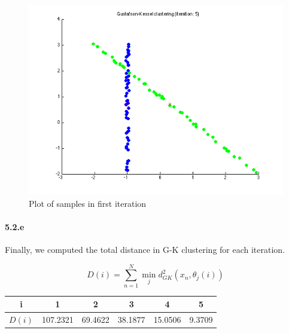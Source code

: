 \documentclass[a4paper]{article}
\begin{document}
	\begin{figure}[H]
		\centering
			\includegraphics[scale=.55]{images/gk_clustering_5.png}
		\caption{Plot of samples in first iteration}
	\end{figure}
	
\paragraph{5.2.e} Finally, we computed the total distance in G-K clustering for each iteration.

	\begin{equation}
		D(i) = \sum_{n=1}^N \min_j d^2_{GK}(x_n, \theta_j(i))
	\end{equation}
	
	\begin{center}
		\begin{tabular}{ |c |c |c |c |c |c| }
			\hline
			i & 1 & 2 & 3 & 4 & 5 \\ \hline
			$D(i)$ & 107.2321 &  69.4622 &  38.1877  & 15.0506  &  9.3709 \\ \hline
		\end{tabular}
	\end{center}
		
\newpage
\end{document}
